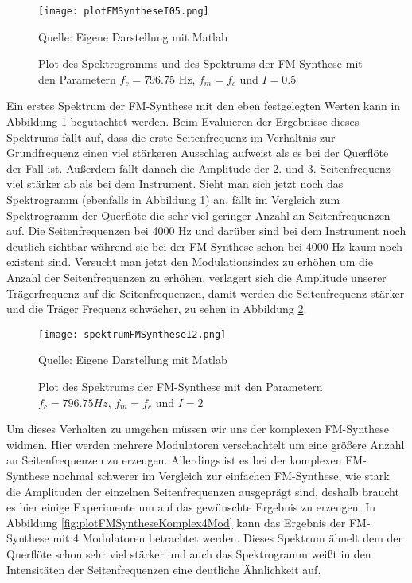 \begin{figure} [ht]
\centering
  \texttt{[image: plotFMSyntheseI05.png]}
\caption{Plot des Spektrogramms und des Spektrums der FM-Synthese mit den Parametern $f_c = 796.75$ Hz, $f_m = f_c$ und $I = 0.5$ }
\label{fig:plotFMSyntheseI05}
Quelle: Eigene Darstellung mit Matlab
\end{figure}

Ein erstes Spektrum der FM-Synthese mit den eben festgelegten Werten kann in Abbildung \ref{fig:plotFMSyntheseI05} begutachtet werden. Beim Evaluieren der Ergebnisse dieses Spektrums fällt auf, dass die erste Seitenfrequenz im Verhältnis zur Grundfrequenz einen viel stärkeren Ausschlag aufweist als es bei der Querflöte der Fall ist. Außerdem fällt danach die Amplitude der 2. und 3. Seitenfrequenz viel stärker ab als bei dem Instrument. Sieht man sich jetzt noch das Spektrogramm (ebenfalls in Abbildung \ref{fig:plotFMSyntheseI05}) an, fällt im Vergleich zum Spektrogramm der Querflöte die sehr viel geringer Anzahl an Seitenfrequenzen auf. Die Seitenfrequenzen bei 4000 Hz und darüber sind bei dem Instrument noch deutlich sichtbar während sie bei der FM-Synthese schon bei 4000 Hz kaum noch existent sind. Versucht man jetzt den Modulationsindex zu erhöhen um die Anzahl der Seitenfrequenzen zu erhöhen, verlagert sich die Amplitude unserer Trägerfrequenz auf die Seitenfrequenzen, damit werden die Seitenfrequenz stärker und die Träger Frequenz schwächer, zu sehen in Abbildung \ref{fig:spektrumFMSyntheseI2}. 

\begin{figure} [ht]
\centering
  \texttt{[image: spektrumFMSyntheseI2.png]}
\caption{Plot des Spektrums der FM-Synthese mit den Parametern $f_c = 796.75 Hz$, $f_m = f_c$ und $I = 2$}
\label{fig:spektrumFMSyntheseI2}
Quelle: Eigene Darstellung mit Matlab
\end{figure}

Um dieses Verhalten zu umgehen müssen wir uns der komplexen FM-Synthese widmen. Hier werden mehrere Modulatoren verschachtelt um eine größere Anzahl an Seitenfrequenzen zu erzeugen. Allerdings ist es bei der komplexen FM-Synthese nochmal schwerer im Vergleich zur einfachen FM-Synthese, wie stark die Amplituden der einzelnen Seitenfrequenzen ausgeprägt sind, deshalb braucht es hier einige Experimente um auf das gewünschte Ergebnis zu erzeugen. In Abbildung \ref{fig:plotFMSyntheseKomplex4Mod} kann das Ergebnis der FM-Synthese mit 4 Modulatoren betrachtet werden. Dieses Spektrum ähnelt dem der Querflöte schon sehr viel stärker und auch das Spektrogramm weißt in den Intensitäten der Seitenfrequenzen eine deutliche Ähnlichkeit auf.

